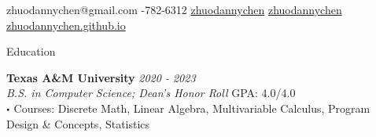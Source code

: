 \documentclass{resume} %
\newcommand{\sep}{\textcolor{black}{$\bigcdot$ }}
\begin{document}
\begin{center}
    \normalsize \faEnvelope \space zhuodannychen@gmail.com \hspace{0.1cm}
    \faPhone {}-782-6312 \hspace{0.1cm}
    \faGithub \space \href{https://github.com/zhuodannychen}{zhuodannychen} \hspace{0.1cm}
    \faLinkedinSquare \space \href{https://www.linkedin.com/in/zhuodannychen/}{zhuodannychen} \hspace{0.1cm}
    \faLink \space \href{https://zhuodannychen.github.io/}{zhuodannychen.github.io}
\end{center}





\begin{rSection}{Education}

{\bf Texas A\&M University} \hfill {\it 2020 - 2023}\\
\textit{B.S. in Computer Science; Dean's Honor Roll} \hfill GPA: 4.0/4.0\\
    \hspace*{0.78em} \sep Courses: Discrete Math, Linear Algebra, Multivariable Calculus,
    Program Design \& Concepts, Statistics


\end{rSection}



\end{document}

